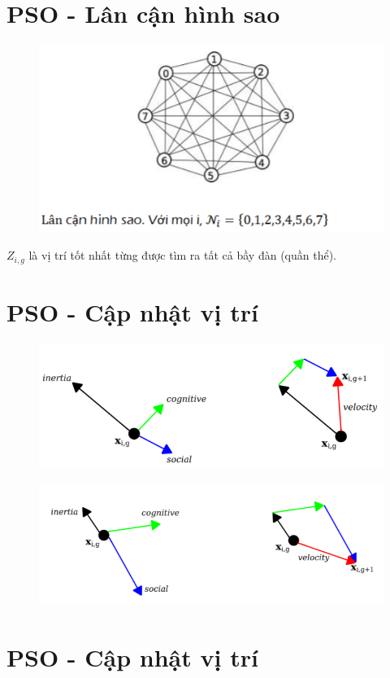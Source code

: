 \documentclass{book}
\begin{document}
\section{PSO - Lân cận hình sao}

\begin{figure}[H]
    \centering
    \includegraphics[width=0.75\linewidth]{images/GA-3_22.png}
\end{figure}
$Z_{i,g}$ là vị trí tốt nhất từng được tìm ra tất cả bầy đàn (quần thể).

\section{PSO - Cập nhật vị trí}


\begin{figure}[H]
    \centering
    \includegraphics[width=0.75\linewidth]{images/GA-3_23.png}
\end{figure}


\begin{figure}[H]
    \centering
    \includegraphics[width=0.75\linewidth]{images/GA-3_24.png}
\end{figure}

\section{PSO - Cập nhật vị trí}
\end{document}
